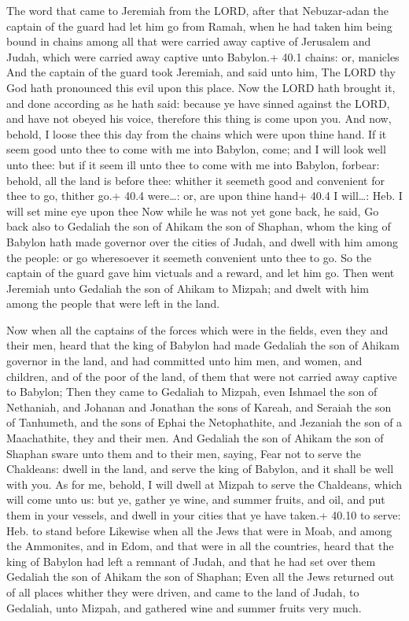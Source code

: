  The word that came to Jeremiah from the LORD, after that
Nebuzar-adan the captain of the guard had let him go from Ramah, when he
had taken him being bound in chains among all that were carried away
captive of Jerusalem and Judah, which were carried away captive unto
Babylon.+ 40.1 chains: or, manicles  And the captain of the
guard took Jeremiah, and said unto him, The LORD thy God hath pronounced
this evil upon this place.  Now the LORD hath brought it,
and done according as he hath said: because ye have sinned against the
LORD, and have not obeyed his voice, therefore this thing is come upon
you.  And now, behold, I loose thee this day from the chains
which were upon thine hand. If it seem good unto thee to come with me
into Babylon, come; and I will look well unto thee: but if it seem ill
unto thee to come with me into Babylon, forbear: behold, all the land is
before thee: whither it seemeth good and convenient for thee to go,
thither go.+ 40.4 were\ldots: or, are upon thine hand+ 40.4 I
will\ldots: Heb. I will set mine eye upon thee  Now while he
was not yet gone back, he said, Go back also to Gedaliah the son of
Ahikam the son of Shaphan, whom the king of Babylon hath made governor
over the cities of Judah, and dwell with him among the people: or go
wheresoever it seemeth convenient unto thee to go. So the captain of the
guard gave him victuals and a reward, and let him go.  Then
went Jeremiah unto Gedaliah the son of Ahikam to Mizpah; and dwelt with
him among the people that were left in the land.

 Now when all the captains of the forces which were in the
fields, even they and their men, heard that the king of Babylon had made
Gedaliah the son of Ahikam governor in the land, and had committed unto
him men, and women, and children, and of the poor of the land, of them
that were not carried away captive to Babylon;  Then they
came to Gedaliah to Mizpah, even Ishmael the son of Nethaniah, and
Johanan and Jonathan the sons of Kareah, and Seraiah the son of
Tanhumeth, and the sons of Ephai the Netophathite, and Jezaniah the son
of a Maachathite, they and their men.  And Gedaliah the son
of Ahikam the son of Shaphan sware unto them and to their men, saying,
Fear not to serve the Chaldeans: dwell in the land, and serve the king
of Babylon, and it shall be well with you.  As for me,
behold, I will dwell at Mizpah to serve the Chaldeans, which will come
unto us: but ye, gather ye wine, and summer fruits, and oil, and put
them in your vessels, and dwell in your cities that ye have taken.+
40.10 to serve: Heb. to stand before  Likewise when all the
Jews that were in Moab, and among the Ammonites, and in Edom, and that
were in all the countries, heard that the king of Babylon had left a
remnant of Judah, and that he had set over them Gedaliah the son of
Ahikam the son of Shaphan;  Even all the Jews returned out
of all places whither they were driven, and came to the land of Judah,
to Gedaliah, unto Mizpah, and gathered wine and summer fruits very much.

